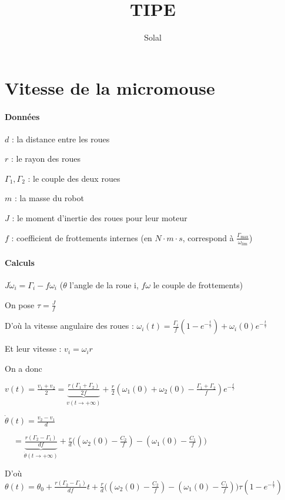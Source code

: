 \documentclass{article}
\title{TIPE}
\author{Solal}
\begin{document}
\maketitle


\section{Vitesse de la micromouse}

\paragraph{Données}

$d$ : la distance entre les roues

$r$ : le rayon des roues

$\Gamma_1, \Gamma_2$ : le couple des deux roues

$m$ : la masse du robot

$J$ : le moment d'inertie des roues pour leur moteur

$f$ : coefficient de frottements internes (en $N\cdot m\cdot s$, correspond à $\frac{\Gamma_{\text{max}}}{\omega_{\text{lim}}}$)

\paragraph{Calculs}

$J\dot\omega_i=\Gamma_i-f\omega_i$ ($\theta$ l'angle de la roue i, $f\omega$ le couple de frottements)

On pose $\tau=\frac J f$

D'où la vitesse angulaire des roues : $\omega_i(t)=\frac {\Gamma_i} f(1-e^{-\frac t\tau})+\omega_i(0)e^{-\frac t\tau}$

Et leur vitesse :
$v_i=\omega_ir$

On a donc

$v(t)=\frac{v_1+v_2}2=\underbrace{\frac{r(\Gamma_1+\Gamma_2)}{2f}}_{v(t\to+\infty)}+\frac r 2(\omega_1(0)+\omega_2(0)-\frac{\Gamma_1+\Gamma_2}{f})e^{-\frac t\tau}$

$\dot\theta(t)=\frac{v_2-v_1}d$

$\quad=\underbrace{\frac{r(\Gamma_2-\Gamma_1)}{df}}_{\dot\theta(t\to+\infty)}+\frac rd\big((\omega_2(0)-\frac {C_2}f)-(\omega_1(0)-\frac{C_1}f)\big)$

D'où $\theta(t)=\theta_0+\frac{r(\Gamma_2-\Gamma_1)}{df}t+\frac rd\big((\omega_2(0)-\frac {C_2}f)-(\omega_1(0)-\frac{C_1}f)\big)\tau(1-e^{-\frac t\tau})$
\end{document}
